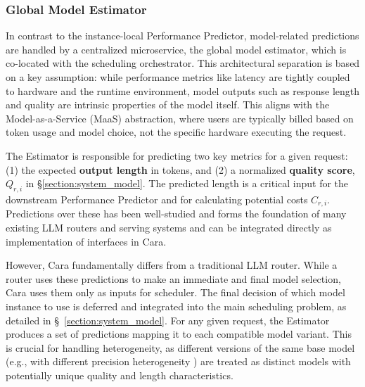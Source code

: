 \documentclass[letterpaper, anonymous, twocolumn, 10pt]{article}
\begin{document}
\subsubsection{Global Model Estimator}

In contrast to the instance-local Performance Predictor, model-related predictions are handled by a centralized microservice, the global model estimator, which is co-located with the scheduling orchestrator. This architectural separation is based on a key assumption: while performance metrics like latency are tightly coupled to hardware and the runtime environment, model outputs such as response length and quality are intrinsic properties of the model itself. This aligns with the Model-as-a-Service (MaaS) abstraction, where users are typically billed based on token usage and model choice, not the specific hardware executing the request.

The Estimator is responsible for predicting two key metrics for a given request: (1) the expected \textbf{output length} in tokens, and (2) a normalized \textbf{quality score}, $Q_{r,i}$ in \S \ref{section:system_model}. The predicted length is a critical input for the downstream Performance Predictor and for calculating potential costs $C_{r,i}$. Predictions over these has been well-studied and forms the foundation of many existing LLM routers \cite{lakha2025faster, chen2023frugalgpthowuse, Ong2024RouteLLMLT, mei2025eccosefficientcapability, universal_model_routering, wu2025qualityofserviceawarellm, ye2025beyondgpt5making} and serving systems \cite{arango2025prefix, qlm, Gong_2025, xue2023responselengthperception, hu2024inferenceinterferencedisaggregatellm} and can be integrated directly as implementation of interfaces in Cara.

However, Cara fundamentally differs from a traditional LLM router. While a router uses these predictions to make an immediate and final model selection, Cara uses them only as inputs for scheduler. The final decision of which model instance to use is deferred and integrated into the main scheduling problem, as detailed in \S~\ref{section:system_model}. For any given request, the Estimator produces a set of predictions mapping it to each compatible model variant. This is crucial for handling heterogeneity, as different versions of the same base model (e.g., with different precision heterogeneity \cite{bin2025fineserveprecisionawarekvslab}) are treated as distinct models with potentially unique quality and length characteristics.
\end{document}
